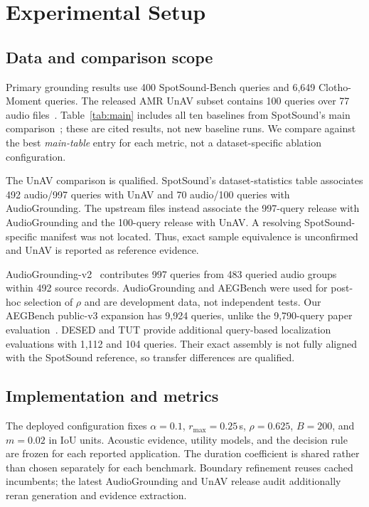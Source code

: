 \section{Experimental Setup}
\label{sec:experiments}
\subsection{Data and comparison scope}
Primary grounding results use 400 SpotSound-Bench queries and 6,649 Clotho-Moment queries. The released AMR UnAV subset contains 100 queries over 77 audio files~\cite{munakata2025amr}. Table~\ref{tab:main} includes all ten baselines from SpotSound's main comparison~\cite{sun2026spotsound}; these are cited results, not new baseline runs. We compare against the best \emph{main-table} entry for each metric, not a dataset-specific ablation configuration.

The UnAV comparison is qualified. SpotSound's dataset-statistics table associates 492 audio/997 queries with UnAV and 70 audio/100 queries with AudioGrounding. The upstream files instead associate the 997-query release with AudioGrounding and the 100-query release with UnAV. A resolving SpotSound-specific manifest was not located. Thus, exact sample equivalence is unconfirmed and UnAV is reported as reference evidence.

AudioGrounding-v2~\cite{xu2021grounding} contributes 997 queries from 483 queried audio groups within 492 source records. AudioGrounding and AEGBench were used for post-hoc selection of $\rho$ and are development data, not independent tests. Our AEGBench public-v3 expansion has 9,924 queries, unlike the 9,790-query paper evaluation~\cite{zhang2026autoaeg}. DESED and TUT provide additional query-based localization evaluations with 1,112 and 104 queries. Their exact assembly is not fully aligned with the SpotSound reference, so transfer differences are qualified.

\subsection{Implementation and metrics}
The deployed configuration fixes $\alpha=0.1$, $r_{\max}=0.25$\,s, $\rho=0.625$, $B=200$, and $m=0.02$ in IoU units. Acoustic evidence, utility models, and the decision rule are frozen for each reported application. The duration coefficient is shared rather than chosen separately for each benchmark. Boundary refinement reuses cached incumbents; the latest AudioGrounding and UnAV release audit additionally reran generation and evidence extraction.

